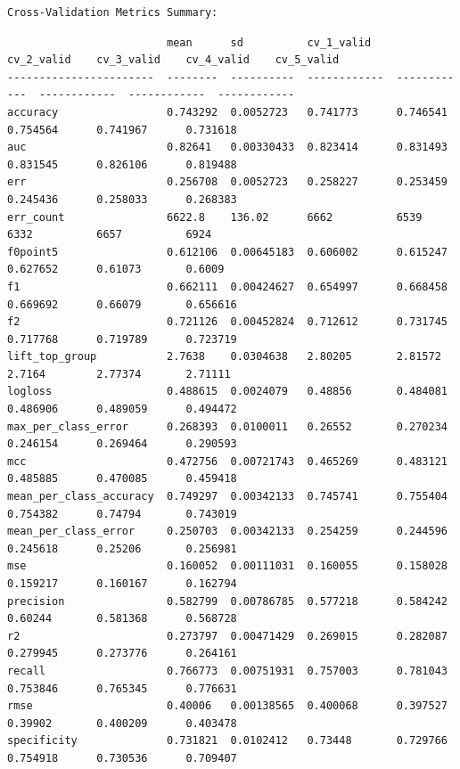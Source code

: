 \documentclass[11pt]{article}
\begin{document}
    \begin{Verbatim}[commandchars=\\\{\}]
Cross-Validation Metrics Summary: 

    \end{Verbatim}

    
    \begin{verbatim}
                         mean      sd          cv_1_valid    cv_2_valid    cv_3_valid    cv_4_valid    cv_5_valid
-----------------------  --------  ----------  ------------  ------------  ------------  ------------  ------------
accuracy                 0.743292  0.0052723   0.741773      0.746541      0.754564      0.741967      0.731618
auc                      0.82641   0.00330433  0.823414      0.831493      0.831545      0.826106      0.819488
err                      0.256708  0.0052723   0.258227      0.253459      0.245436      0.258033      0.268383
err_count                6622.8    136.02      6662          6539          6332          6657          6924
f0point5                 0.612106  0.00645183  0.606002      0.615247      0.627652      0.61073       0.6009
f1                       0.662111  0.00424627  0.654997      0.668458      0.669692      0.66079       0.656616
f2                       0.721126  0.00452824  0.712612      0.731745      0.717768      0.719789      0.723719
lift_top_group           2.7638    0.0304638   2.80205       2.81572       2.7164        2.77374       2.71111
logloss                  0.488615  0.0024079   0.48856       0.484081      0.486906      0.489059      0.494472
max_per_class_error      0.268393  0.0100011   0.26552       0.270234      0.246154      0.269464      0.290593
mcc                      0.472756  0.00721743  0.465269      0.483121      0.485885      0.470085      0.459418
mean_per_class_accuracy  0.749297  0.00342133  0.745741      0.755404      0.754382      0.74794       0.743019
mean_per_class_error     0.250703  0.00342133  0.254259      0.244596      0.245618      0.25206       0.256981
mse                      0.160052  0.00111031  0.160055      0.158028      0.159217      0.160167      0.162794
precision                0.582799  0.00786785  0.577218      0.584242      0.60244       0.581368      0.568728
r2                       0.273797  0.00471429  0.269015      0.282087      0.279945      0.273776      0.264161
recall                   0.766773  0.00751931  0.757003      0.781043      0.753846      0.765345      0.776631
rmse                     0.40006   0.00138565  0.400068      0.397527      0.39902       0.400209      0.403478
specificity              0.731821  0.0102412   0.73448       0.729766      0.754918      0.730536      0.709407
    \end{verbatim}
\end{document}
